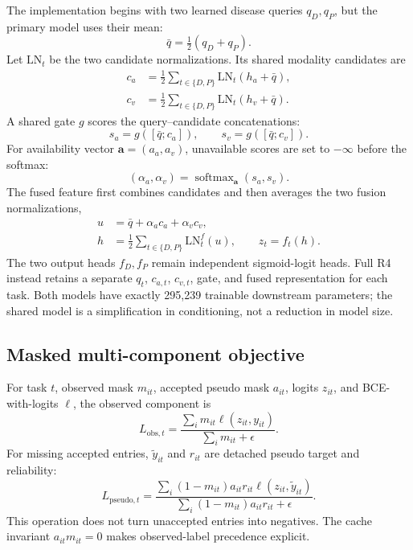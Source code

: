 The implementation begins with two learned disease queries $q_D,q_P$, but the primary model uses their mean:
\begin{equation}
 \bar q=\tfrac12(q_D+q_P).
\end{equation}
Let $\mathrm{LN}_t$ be the two candidate normalizations. Its shared modality candidates are
\begin{equation}
\begin{aligned}
 c_a&=\tfrac12\sum_{t\in\{D,P\}}\mathrm{LN}_{t}(h_a+\bar q),\\
 c_v&=\tfrac12\sum_{t\in\{D,P\}}\mathrm{LN}_{t}(h_v+\bar q).
\end{aligned}
 \label{eq:candidates}
\end{equation}
A shared gate $g$ scores the query--candidate concatenations:
\begin{equation}
 s_a=g([\bar q;c_a]),\qquad s_v=g([\bar q;c_v]).
\end{equation}
For availability vector $\mathbf a=(a_a,a_v)$, unavailable scores are set to $-\infty$ before the softmax:
\begin{equation}
 (\alpha_a,\alpha_v)=\operatorname{softmax}_{\mathbf a}(s_a,s_v).
 \label{eq:gate}
\end{equation}
The fused feature first combines candidates and then averages the two fusion normalizations,
\begin{equation}
\begin{aligned}
 u&=\bar q+\alpha_ac_a+\alpha_vc_v,\\
 h&=\tfrac12\sum_{t\in\{D,P\}}\mathrm{LN}^{f}_{t}(u),\qquad z_t=f_t(h).
\end{aligned}
 \label{eq:fuse}
\end{equation}
The two output heads $f_D,f_P$ remain independent sigmoid-logit heads. Full R4 instead retains a separate $q_t$, $c_{a,t}$, $c_{v,t}$, gate, and fused representation for each task. Both models have exactly 295,239 trainable downstream parameters; the shared model is a simplification in conditioning, not a reduction in model size.

\subsection{Masked multi-component objective}

For task $t$, observed mask $m_{it}$, accepted pseudo mask $a_{it}$, logits $z_{it}$, and BCE-with-logits $\ell$, the observed component is
\begin{equation}
 L_{\mathrm{obs},t} =
 \frac{\sum_i m_{it}\ell(z_{it},y_{it})}{\sum_i m_{it}+\epsilon}.
 \label{eq:obs}
\end{equation}
For missing accepted entries, $\tilde y_{it}$ and $r_{it}$ are detached pseudo target and reliability:
\begin{equation}
 L_{\mathrm{pseudo},t} =
 \frac{\sum_i(1-m_{it})a_{it}r_{it}\ell(z_{it},\tilde y_{it})}
 {\sum_i(1-m_{it})a_{it}r_{it}+\epsilon}.
 \label{eq:pseudo}
\end{equation}
This operation does not turn unaccepted entries into negatives. The cache invariant $a_{it}m_{it}=0$ makes observed-label precedence explicit.

